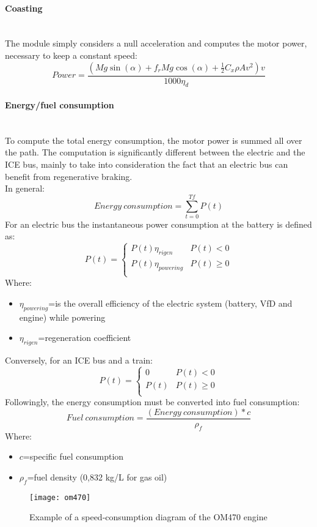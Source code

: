 \documentclass{article}
\newcommand{\subsubsubsection}[1]{\paragraph{#1}\mbox{}\\}
\begin{document}
\subsubsubsection{Coasting}
The module simply considers a null acceleration and computes the motor power, necessary to keep a constant speed: 
\begin{equation}
Power=\frac{(Mg\sin(\alpha)+f_{r}Mg\cos(\alpha)+\frac{1}{2}C_{x}\rho Av^2)v}{1000\eta_{d}}
\end{equation}
\subsubsubsection{Energy/fuel consumption}
To compute the total energy consumption, the motor power is summed all over the path. The computation is significantly different between the electric and the ICE bus, mainly to take into consideration the fact that an electric bus can benefit from regenerative braking.\\
In general:
\begin{equation}
Energy\:consumption=\sum_{t=0}^{Tf}P(t)
\end{equation}
For an electric bus the instantaneous power consumption at the battery is defined as:
\begin{equation}
P(t)=
\begin{cases}
P(t)\eta_{rigen} & P(t)<0 \\
P(t)\eta_{powering} &  P(t)\geq0\\
\end{cases}
\end{equation}
Where:
\begin{itemize}
\item $\eta_{powering}$=is the overall efficiency of the electric system (battery, VfD and engine) while powering 
\item $\eta_{rigen}$=regeneration coefficient
\end{itemize}
Conversely, for an ICE bus and a train: 
\begin{equation}
P(t)=
\begin{cases}
0 & P(t)<0 \\
P(t) &  P(t)\geq0\\
\end{cases}
\end{equation}
Followingly, the energy consumption must be converted into fuel consumption: 
\begin{equation}
Fuel\:consumption=\frac{(Energy\:consumption)*c}{\rho_f}
\end{equation}
Where:
\begin{itemize}
\item $c$=specific fuel consumption 
\item $\rho_f$=fuel density (0,832 kg/L for gas oil) 
\end{itemize}
\begin{figure}[H]
\centering
\texttt{[image: om470]}
\caption{Example of a speed-consumption diagram of the OM470 engine}
\end{figure} 
\newpage
\end{document}
